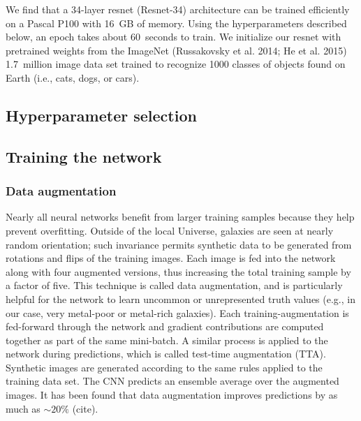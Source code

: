 \documentclass[fleqn,usenatbib]{mnras}
\begin{document}
We find that a 34-layer resnet (Resnet-34) architecture can be trained efficiently on a Pascal P100 with 16~GB of memory.
Using the hyperparameters described below, an epoch takes about 60~seconds to train.
We initialize our resnet with pretrained weights from the ImageNet (Russakovsky et al. 2014; He et al. 2015) 1.7~million image data set trained to recognize 1000 classes of objects found on Earth (i.e., cats, dogs, or cars).


\subsection{Hyperparameter selection}


\subsection{Training the network}


\subsubsection{Data augmentation}
Nearly all neural networks benefit from larger training samples because they help prevent overfitting.
Outside of the local Universe, galaxies are seen at nearly random orientation; such invariance permits synthetic data to be generated from rotations and flips of the training images.
Each image is fed into the network along with four augmented versions, thus increasing the total training sample by a factor of five.
This technique is called data augmentation, and is particularly helpful for the network to learn uncommon or unrepresented truth values (e.g., in our case, very metal-poor or metal-rich galaxies).
Each training-augmentation is fed-forward through the network and gradient contributions are computed together as part of the same mini-batch.
A similar process is applied to the network during predictions, which is called test-time augmentation (TTA).
Synthetic images are generated according to the same rules applied to the training data set. 
The CNN predicts an ensemble average over the augmented images.
It has been found that data augmentation improves predictions by as much as $\sim 20\%$ (cite).
\end{document}

